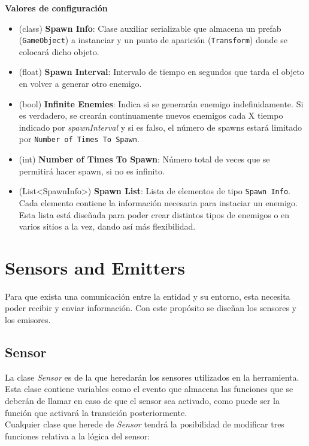 \textbf{Valores de configuración}
\begin{itemize}
    \item (class) \textbf{Spawn Info}: Clase auxiliar serializable que almacena un prefab (\texttt{GameObject}) a instanciar y un punto de aparición (\texttt{Transform}) donde se colocará dicho objeto.
    \item (float) \textbf{ Spawn Interval}: Intervalo de tiempo en segundos que tarda el objeto en volver a generar otro enemigo. 
    \item (bool) \textbf{Infinite Enemies}: Indica si se generarán enemigo indefinidamente. Si es verdadero, se crearán continuamente nuevos enemigos cada X tiempo indicado por  \textit{spawnInterval}  y si es falso, el número de spawns estará limitado por \texttt{Number of Times To Spawn}.
    \item (int) \textbf{Number of Times To Spawn}: Número total de veces que se permitirá hacer spawn, si no es infinito.
    \item (List<SpawnInfo>) \textbf{Spawn List}: Lista de elementos de tipo \texttt{Spawn Info}. Cada elemento contiene la información necesaria para instaciar un enemigo. Esta lista está diseñada para poder crear distintos tipos de enemigos o en varios sitios a la vez, dando así más flexibilidad.
\end{itemize}


\section{Sensors and Emitters}

Para que exista una comunicación entre la entidad y su entorno, esta necesita poder recibir y enviar información. Con este propósito se diseñan los sensores y los emisores.\\

\subsection{Sensor}

La clase \textit{Sensor} es de la que heredarán los sensores utilizados en la herramienta. Esta clase contiene variables como el evento que almacena las funciones que se deberán de llamar en caso de que el sensor sea activado, como puede ser la función que activará la transición posteriormente.\\

Cualquier clase que herede de \textit{Sensor} tendrá la posibilidad de modificar tres funciones relativa a la lógica del sensor:

